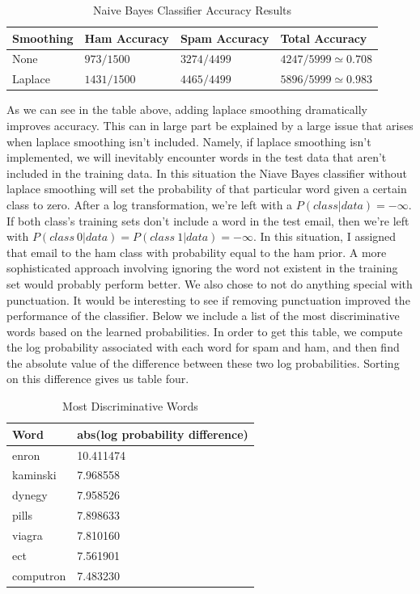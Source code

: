 \documentclass[12pt]{article}
\begin{document}
\begin{enumerate}
\begin{table}[htb]
	\centering
	\begin{tabular}{|l|l|l|l|}
		\hline
		Smoothing & Ham Accuracy        & Spam Accuracy       & Total Accuracy                   \\ \hline
		None      & $973/1500$  & $3274/4499$ & $4247/5999 \simeq 0.708$ \\ \hline
		Laplace   & $1431/1500$ & $4465/4499$ & $5896/5999 \simeq 0.983$ \\ \hline
	\end{tabular}
	\caption{Naive Bayes Classifier Accuracy Results} \label{tab:sometab}
\end{table}

As we can see in the table above, adding laplace smoothing dramatically improves accuracy. This can  in large part be explained by a large issue that arises when laplace smoothing isn't included. Namely, if laplace smoothing isn't implemented, we will inevitably encounter words in the test data that aren't included in the training data. In this situation the Niave Bayes classifier without laplace smoothing will set the probability of that particular word given a certain class to zero. After a log transformation, we're left with a $P(class|data) = -\infty$. If both class's training sets don't include a word in the test email, then we're left with $P(class\ 0|data) = P(class\ 1|data) = -\infty$. In this situation, I assigned that email to the ham class with probability equal to the ham prior. A more sophisticated approach involving ignoring the word not existent in the training set would probably perform better. We also chose to not do anything special with punctuation. It would be interesting to see if removing punctuation improved the performance of the classifier. Below we include a list of the most discriminative words based on the learned probabilities. In order to get this table, we compute the log probability associated with each word for spam and ham, and then find the absolute value of the difference between these two log probabilities. Sorting on this difference gives us table four. 

\begin{table}[htb]
	\centering
	\begin{tabular}{|l|l|}
		\hline
		Word      & abs(log probability difference) \\ \hline
		enron     & 10.411474                       \\ \hline
		kaminski  & 7.968558                        \\ \hline
		dynegy    & 7.958526                        \\ \hline
		pills     & 7.898633                        \\ \hline
		viagra    & 7.810160                        \\ \hline
		ect       & 7.561901                        \\ \hline
		computron & 7.483230                        \\ \hline
	\end{tabular}
	\caption{Most Discriminative Words} \label{tab:sometab}
\end{table}
 
\end{enumerate}
\end{document}
